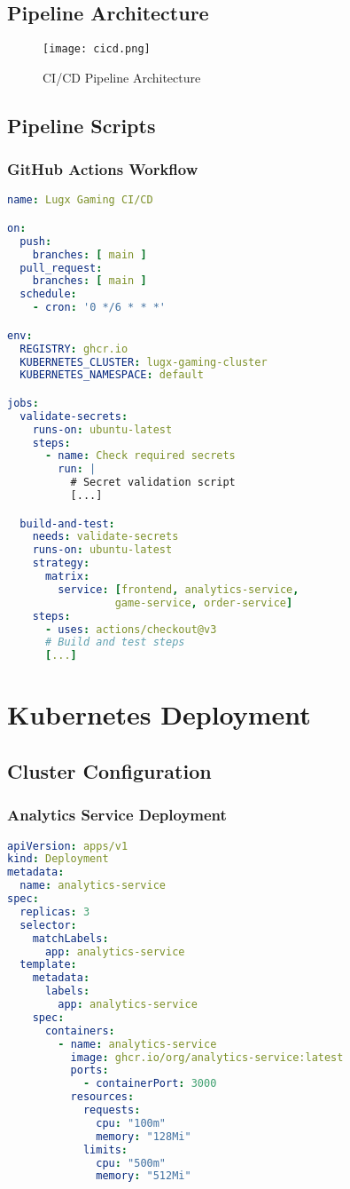 \documentclass[12pt]{report}
\begin{document}
\section{Pipeline Architecture}
\begin{figure}[h]
    \centering
    \texttt{[image: cicd.png]}
    \caption{CI/CD Pipeline Architecture}
\end{figure}

\section{Pipeline Scripts}
\subsection{GitHub Actions Workflow}
\begin{lstlisting}[language=yaml]
name: Lugx Gaming CI/CD

on:
  push:
    branches: [ main ]
  pull_request:
    branches: [ main ]
  schedule:
    - cron: '0 */6 * * *'

env:
  REGISTRY: ghcr.io
  KUBERNETES_CLUSTER: lugx-gaming-cluster
  KUBERNETES_NAMESPACE: default

jobs:
  validate-secrets:
    runs-on: ubuntu-latest
    steps:
      - name: Check required secrets
        run: |
          # Secret validation script
          [...]

  build-and-test:
    needs: validate-secrets
    runs-on: ubuntu-latest
    strategy:
      matrix:
        service: [frontend, analytics-service, 
                 game-service, order-service]
    steps:
      - uses: actions/checkout@v3
      # Build and test steps
      [...]
\end{lstlisting}

\chapter{Kubernetes Deployment}
\section{Cluster Configuration}
\subsection{Analytics Service Deployment}
\begin{lstlisting}[language=yaml]
apiVersion: apps/v1
kind: Deployment
metadata:
  name: analytics-service
spec:
  replicas: 3
  selector:
    matchLabels:
      app: analytics-service
  template:
    metadata:
      labels:
        app: analytics-service
    spec:
      containers:
        - name: analytics-service
          image: ghcr.io/org/analytics-service:latest
          ports:
            - containerPort: 3000
          resources:
            requests:
              cpu: "100m"
              memory: "128Mi"
            limits:
              cpu: "500m"
              memory: "512Mi"
\end{lstlisting}
\end{document}
